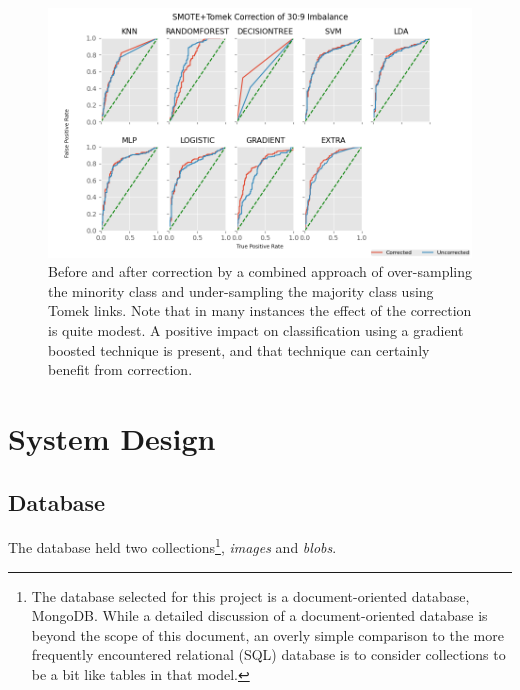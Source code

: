 \documentclass[letterpaper]{article}
\begin{document}
{\begin{figure}[h]
	\centering
	\includegraphics[height=0.25\textheight]{figures/roc-corrected-tomek.png}
	\caption[Before and after correction]{Before and after correction by a combined approach of over-sampling the minority class and under-sampling the majority class using Tomek links. Note that in many instances the effect of the correction is quite modest. A positive impact on classification using a gradient boosted technique is present, and that technique can certainly benefit from correction. }
	\label{fig:auc-tomek}
\end{figure}

%
%
\section{System Design}
\subsection{Database}
The database held two collections\footnote{The database selected for this project is a document-oriented database, MongoDB. While a detailed discussion of a document-oriented database is beyond the scope of this document, an overly simple comparison to the more frequently encountered relational (SQL) database is to consider collections to be a bit like tables in that model.}, \textit{images} and \textit{blobs}.

}
\end{document}
